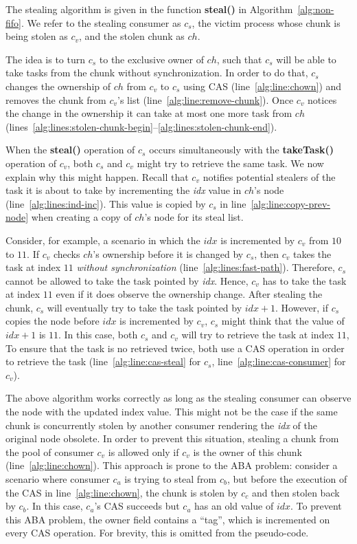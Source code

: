 The stealing algorithm is given in the function {\bf steal()} in Algorithm~\ref{alg:non-fifo}. 
We refer to the stealing consumer as $c_s$, the victim process whose chunk is being stolen as $c_v$, and the stolen chunk as $ch$.

The idea is to turn $c_s$ to the exclusive owner of $ch$, such that $c_s$ will be able to take tasks from the chunk without synchronization. 
In order to do that, $c_s$ changes the ownership of $ch$ from $c_v$ to $c_s$ using CAS (line~\ref{alg:line:chown}) and removes the chunk from $c_v$'s list (line~\ref{alg:line:remove-chunk}). 
Once $c_v$ notices the change in the ownership it can take at most one more task from $ch$ (lines~\ref{alg:lines:stolen-chunk-begin}--\ref{alg:lines:stolen-chunk-end}). 

When the {\bf steal()} operation of $c_s$ occurs simultaneously with the {\bf takeTask()} operation of $c_v$, both $c_s$ and $c_v$ might try to retrieve the same task. We now explain why this might happen. Recall that $c_v$ notifies potential stealers of the task it is about to take by incrementing the \emph{idx} value in $ch$'s node (line~\ref{alg:lines:ind-inc}). This value is copied by $c_s$ in line~\ref{alg:line:copy-prev-node} when creating a copy of $ch$'s node for its steal list.

Consider, for example, a scenario in which the $idx$ is incremented by $c_v$ from $10$ to $11$. 
If $c_v$ checks $ch$'s ownership before it is changed by $c_s$, then $c_v$ takes the task at index $11$ \emph{without synchronization} (line~\ref{alg:lines:fast-path}). Therefore, $c_s$ cannot be allowed to take the task pointed by \emph{idx}. Hence, $c_v$ has to take the task at index $11$ even if it does observe the ownership change. 
After stealing the chunk, $c_s$ will eventually try to take the task pointed by $idx+1$. However, if $c_s$ copies the node before $idx$ is incremented by $c_v$, $c_s$ might think that the value of $idx+1$ is $11$. In this case, both $c_s$ and $c_v$ will try to retrieve the task at index $11$, To ensure that the task is no retrieved twice, both use a CAS operation in order to retrieve the task (line~\ref{alg:line:cas-steal} for $c_s$, line~\ref{alg:line:cas-consumer} for $c_v$). 

The above algorithm works correctly as long as the stealing consumer can observe the node with the updated index value. 
This might not be the case if the same chunk is concurrently stolen by another consumer rendering the \emph{idx} of the original node obsolete. 
In order to prevent this situation, stealing a chunk from the pool of consumer $c_v$ is allowed only if $c_v$ is the owner of this chunk (line~\ref{alg:line:chown}). This approach is prone to the ABA problem: consider a scenario where consumer $c_a$ is trying to steal from $c_b$, but before the execution of the CAS in line~\ref{alg:line:chown}, the chunk is stolen by $c_c$ and then stolen back by $c_b$. In this case, $c_a$'s CAS succeeds but $c_a$ has an old value of $idx$. To prevent this ABA problem, the owner field contains a ``tag'', which is incremented on every CAS operation. For brevity, this is omitted from the pseudo-code.

